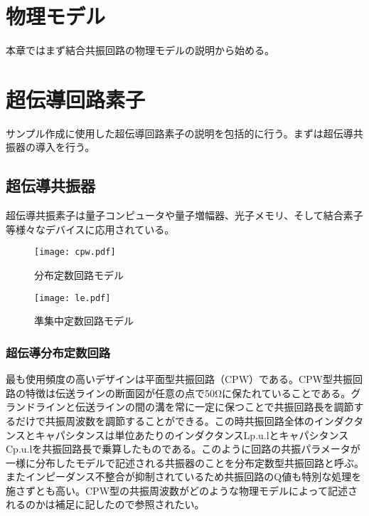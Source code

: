 \section{物理モデル}
    本章ではまず結合共振回路の物理モデルの説明から始める。
\section{超伝導回路素子}
    サンプル作成に使用した超伝導回路素子の説明を包括的に行う。まずは超伝導共振器の導入を行う。
    \subsection{超伝導共振器}
        超伝導共振素子は量子コンピュータ\cite*{Goppl2008}や量子増幅器、光子メモリ\cite*{Pierre2014}、そして結合素子\cite*{Baust2015,Reuther2009}等様々なデバイスに応用されている。
        \begin{figure}[H]
            \begin{minipage}[t]{0.5\columnwidth}
                \centering
                \texttt{[image: cpw.pdf]}
                \caption{分布定数回路モデル}
            \end{minipage}%
            \begin{minipage}[t]{0.5\columnwidth}
                \centering
                \texttt{[image: le.pdf]}
                \caption{準集中定数回路モデル}
            \end{minipage}
        \end{figure}

        \subsubsection{超伝導分布定数回路}
            最も使用頻度の高いデザインは平面型共振回路（CPW）である。CPW型共振回路の特徴は伝送ラインの断面図が任意の点で50Ωに保たれていることである。グランドラインと伝送ラインの間の溝を常に一定に保つことで共振回路長を調節するだけで共振周波数を調節することができる。この時共振回路全体のインダクタンスとキャパシタンスは単位あたりのインダクタンスLp.u.lとキャパシタンスCp.u.lを共振回路長で乗算したものである。このように回路の共振パラメータが一様に分布したモデルで記述される共振器のことを分布定数型共振回路と呼ぶ。またインピーダンス不整合が抑制されているため共振回路のQ値も特別な処理を施さずとも高い。CPW型の共振周波数がどのような物理モデルによって記述されるのかは補足に記したので参照されたい。
